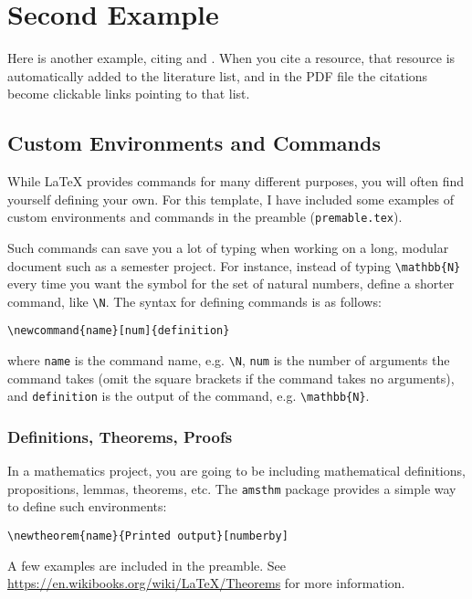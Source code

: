 
\chapter{Second Example}
\label{ch:second-example}

Here is another example, citing \citep{rosen} and \citep{edpenn}.
When you cite a resource, that resource is automatically added to the literature list, and in the PDF file the citations become clickable links pointing to that list.


\section{Custom Environments and Commands}
\label{sec:custom}

While \LaTeX{} provides commands for many different purposes, you will often find yourself defining your own.
For this template, I have included some examples of custom environments and commands in the preamble (\texttt{premable.tex}).

Such commands can save you a lot of typing when working on a long, modular document such as a semester project.
For instance, instead of typing \verb!\mathbb{N}! every time you want the symbol for the set of natural numbers, define a shorter command, like \verb!\N!.
The syntax for defining commands is as follows:
%
\begin{verbatim}
\newcommand{name}[num]{definition}
\end{verbatim}
%
where \texttt{name} is the command name, e.g. \verb!\N!, \texttt{num} is the number of arguments the command takes (omit the square brackets if the command takes no arguments), and \texttt{definition} is the output of the command, e.g. \verb!\mathbb{N}!.


\subsection{Definitions, Theorems, Proofs}
\label{sec:thms}

In a mathematics project, you are going to be including mathematical definitions, propositions, lemmas, theorems, etc.
The \texttt{amsthm} package provides a simple way to define such environments:
%
\begin{verbatim}
\newtheorem{name}{Printed output}[numberby]
\end{verbatim}
%
A few examples are included in the preamble.
See \url{https://en.wikibooks.org/wiki/LaTeX/Theorems} for more information.


